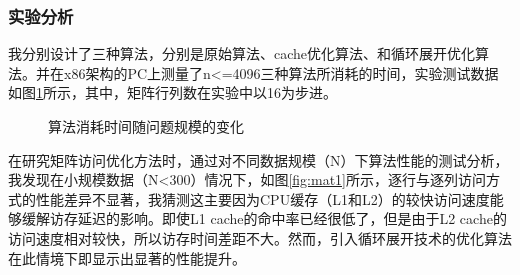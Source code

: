 \documentclass[a4paper]{article}
\begin{document}
          \subsubsection{实验分析}
              我分别设计了三种算法，分别是原始算法、cache优化算法、和循环展开优化算法。并在x86架构的PC上测量了n<=4096三种算法所消耗的时间，实验测试数据如图\ref{fig:all1}所示，其中，矩阵行列数在实验中以16为步进。
                  \begin{figure}[!htbp]
                    \centering
                    \centering
                    \caption{算法消耗时间随问题规模的变化}
                    \label{fig:mat2}
                    \label{fig:all1}
                \end{figure}
                在研究矩阵访问优化方法时，通过对不同数据规模（N）下算法性能的测试分析，我发现在小规模数据（N<300）情况下，如图\ref{fig:mat1}所示，逐行与逐列访问方式的性能差异不显著，我猜测这主要因为CPU缓存（L1和L2）的较快访问速度能够缓解访存延迟的影响。即使L1 cache的命中率已经很低了，但是由于L2 cache的访问速度相对较快，所以访存时间差距不大。然而，引入循环展开技术的优化算法在此情境下即显示出显著的性能提升。
                
\end{document}
